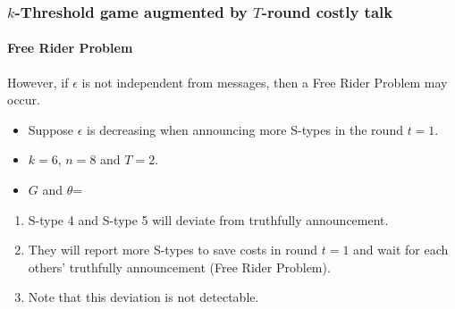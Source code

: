 \documentclass[9pt]{beamer}
\begin{document}
\begin{frame}
   \frametitle{$k$-Threshold game augmented by $T$-round costly talk}
\framesubtitle{Free Rider Problem}

\alert{However}, if $\epsilon$ is \alert{not independent from messages}, then a \alert{Free Rider Problem} may occur.
\begin{itemize}
\item Suppose $\epsilon$ \alert{is decreasing} when announcing \alert{more} S-types in the round \alert{$t=1$}.
\item $k=6$, $n=8$ and $T=2$.
\item $G$ and $\theta$=
\begin{center}
\end{center}



\end{itemize}

\begin{enumerate}
\item S-type \alert{4} and S-type \alert{5} will deviate from truthfully announcement.
\item They will report more S-types to save costs in round $t=1$ and wait for each others' truthfully announcement (Free Rider Problem).
\item Note that this deviation is not detectable.
\end{enumerate}


\end{frame}
\end{document}
